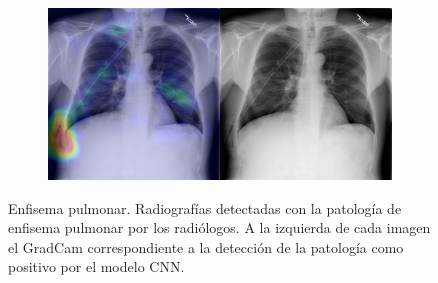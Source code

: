 \begin{figure}[b]
\begin{subfigure}{0.4\textwidth}
    \end{subfigure}
    \begin{subfigure}{0.4\textwidth}
        \centering
        \includegraphics[width=1.0\textwidth]{Chapters/5. Conclusiones/img/Emphysema/1_1_00023078_006.png}
    \end{subfigure}

    \caption{Enfisema pulmonar. Radiografías detectadas con la patología de enfisema pulmonar por los
                    radiólogos. A la izquierda de cada imagen el GradCam correspondiente a la detección
                    de la patología como positivo por el modelo CNN.}
\end{figure}

